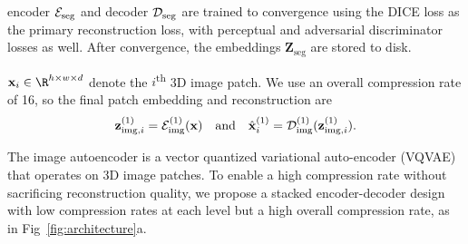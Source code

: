 encoder $\mathcal{E}_{\rm seg}$ and decoder $\mathcal{D}_{\rm seg}$ are trained to convergence using the DICE loss as the primary reconstruction loss, with perceptual and adversarial discriminator losses as well.\cite{esser2020taming} After convergence, the embeddings $\mathbf{Z}_{\mathrm{seg}}$ are stored to disk.

$\mathbf{x}_i \in \R^{h \times w \times d}$ denote the $i$\textsuperscript{th} 3D image patch. We use an overall compression rate of 16, so the final patch embedding and reconstruction are
\begin{equation}
    \label{eq:6}
    \mathbf{z}_{\mathrm{img},i}^{(1)} = \mathcal{E}_{\rm img}^{(1)}(\mathbf{x})
  \text{~~~and~~~} \hat{\mathbf{x}}_i^{(1)} = \mathcal{D}_{\rm img}^{(1)}(\mathbf{z}_{\mathrm{img},i}^{(1)}).
\end{equation}

The image autoencoder is a vector quantized variational auto-encoder (VQVAE)\cite{van2017neural} that operates on 3D image patches.
To enable a high compression rate without sacrificing reconstruction quality,\cite{esser2020taming} we propose a stacked encoder-decoder design with low compression rates at each level but a high overall compression rate, as in Fig~\ref{fig:architecture}a.

